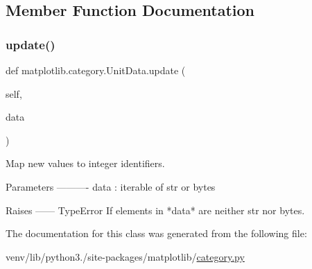 \subsection{Member Function Documentation}
\mbox{\label{classmatplotlib_1_1category_1_1UnitData_a2aec47dec865f29c3cd59bfd0912abc7}} 
\subsubsection{\texorpdfstring{update()}{update()}}
{\footnotesize\ttfamily def matplotlib.\+category.\+Unit\+Data.\+update (\begin{DoxyParamCaption}\item[{}]{self,  }\item[{}]{data }\end{DoxyParamCaption})}

\begin{DoxyVerb}Map new values to integer identifiers.

Parameters
----------
data : iterable of str or bytes

Raises
------
TypeError
    If elements in *data* are neither str nor bytes.
\end{DoxyVerb}
 

The documentation for this class was generated from the following file\+:\begin{DoxyCompactItemize}
\item 
venv/lib/python3./site-\/packages/matplotlib/\hyperlink{category_8py}{category.\+py}\end{DoxyCompactItemize}
